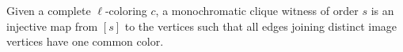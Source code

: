 \begin{definition}
Given a complete $\ell$-coloring $c$, a monochromatic clique witness of order
$s$ is an injective map from $[s]$ to the vertices such that all edges joining
distinct image vertices have one common color.
\end{definition}
